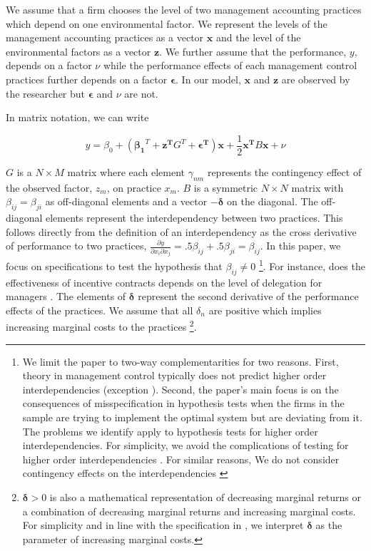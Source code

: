 \documentclass[12pt]{article}
\begin{document}
We assume that a firm chooses the level of two management accounting practices which depend on one environmental factor. We represent the levels of the management accounting practices as a vector $\mathbf{x}$ and the level of the environmental factors as a vector $\mathbf{z}$. We further assume that the performance, $y$, depends on a factor $\nu$ while the performance effects of each management control practices further depends on a factor $\mathbf{\epsilon}$. In our model, $\mathbf{x}$ and $\mathbf{z}$ are observed by the researcher but $\mathbf{\epsilon}$ and $\nu$ are not. 


In matrix notation, we can write

\begin{equation} \label{eq:structural-matrix}
y = \beta_0 + (\mathbf{\beta_1}^T + \mathbf{z^T} G^T + \mathbf{\epsilon^T})
     \mathbf{x} + \frac{1}{2}\mathbf{x^T} B \mathbf{x} + \nu
\end{equation}

$G$ is a $N \times M$ matrix where each element $\gamma_{nm}$ represents the contingency effect of the observed factor, $z_m$, on practice $x_m$. $B$ is a symmetric $N \times N$ matrix with $\beta_{ij} = \beta_{ji}$ as off-diagonal elements and a vector $-\mathbf{\delta}$ on the diagonal. The off-diagonal elements represent the interdependency between two practices. This follows directly from the definition of an interdependency as the cross derivative of performance to two practices, $\frac{\partial y}{\partial x_i \partial x_j} = .5 \beta_{ij} + .5 \beta_{ji} = \beta_{ij}$. In this paper, we focus on specifications to test the hypothesis that $\beta_{ij} \neq 0$ \footnote{We limit the paper to two-way complementarities for two reasons. First, theory in management control typically does not predict higher order interdependencies (exception \citet{Aral2012}). Second, the paper's main focus is on the consequences of misspecification in hypothesis tests when the firms in the sample are trying to implement the optimal system but are deviating from it. The problems we identify apply to hypothesis tests for higher order interdependencies. For simplicity, we avoid the complications of testing for higher order interdependencies \citep{Carree2011}. For similar reasons, We do not consider contingency effects on the interdependencies \citep{Grabner2016,Matejka2017BalancingEvidence}}. For instance, does the effectiveness of incentive contracts depends on the level of delegation for managers \citep{Moers2006}.  The elements of $\mathbf{\delta}$ represent the second derivative of the performance effects of the practices. We assume that all $\delta_n$ are positive which implies increasing marginal costs to the practices  \footnote{$\mathbf{\delta} > 0$ is also a mathematical representation of decreasing marginal returns or a combination of decreasing marginal returns and increasing marginal  costs. For simplicity and in line with the specification in \citet{Grabner2013}, we interpret $\mathbf{\delta}$ as the parameter of  increasing marginal costs.}. 
\end{document}
